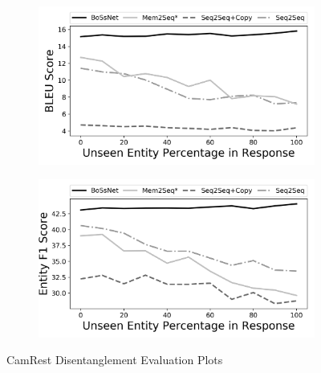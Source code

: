 \begin{figure}[!t]
\centering
\begin{subfigure}{0.8\textwidth}
 \includegraphics[width=\linewidth]{assets/graphs/camrest_BLEU.png}
 \caption{}\label{fig:camBleu}
\end{subfigure}

\vspace*{0.5in}

\begin{subfigure}{0.8\textwidth}
 \includegraphics[width=\linewidth]{assets/graphs/camrest_F1.png}
 \caption{}\label{fig:camF1}
\end{subfigure}

\caption{CamRest Disentanglement Evaluation Plots}
\end{figure}

\clearpage


